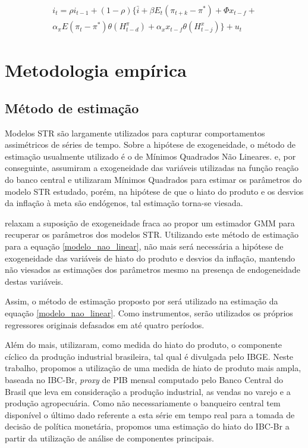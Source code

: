 \documentclass[
	article,			%
	11pt,				%
	oneside,			%
	a4paper,			%
	english,			%
	brazil,				%
	]{abntex2}
\begin{document}
	\begin{eqnarray}  \label{modelo_nao_linear}
		i_t = \rho i_{t-1} + (1-\rho) \{ \bar{i} + \beta E_t(\pi_{t+k} - \pi^*) + \Phi x_{t-f} + \nonumber \\ 
		 \alpha_\pi E(\pi_t - \pi^*)\theta(H_{t-d}^\pi) + \alpha_x x_{t-f} \theta (H_{t-j}^x) \} + u_t
	\end{eqnarray}
	


	
	\section{Metodologia empírica}	
	
	\subsection{Método de estimação}
	
	Modelos STR são largamente utilizados para capturar comportamentos assimétricos de séries de tempo. Sobre a hipótese de exogeneidade, o método de estimação usualmente utilizado é o de Mínimos Quadrados Não Lineares.  e, por conseguinte,  assumiram a exogeneidade das variáveis utilizadas na função reação do banco central e utilizaram Mínimos Quadrados para estimar os parâmetros do modelo STR estudado, porém, na hipótese de que o hiato do produto e os desvios da inflação à meta são endógenos, tal estimação torna-se viesada.
	
	 relaxam a suposição de exogeneidade fraca ao propor um estimador GMM para recuperar os parâmetros dos modelos STR.	Utilizando este método de estimação para a equação \ref{modelo_nao_linear}, não mais será necessária a hipótese de exogeneidade das variáveis de hiato do produto e desvios da inflação, mantendo não viesados as estimações dos parâmetros mesmo na presença de endogeneidade destas variáveis.
	
	Assim, o método de estimação proposto por  será utilizado na estimação da equação \ref{modelo_nao_linear}. Como instrumentos, serão utilizados os próprios regressores originais defasados em até quatro períodos.
	
	Além do mais,  utilizaram, como medida do hiato do produto, o componente cíclico da produção industrial brasileira, tal qual é divulgada pelo IBGE. Neste trabalho, propomos a utilização de uma medida de hiato de produto mais ampla, baseada no IBC-Br, \textsl{proxy} de PIB mensal computado pelo Banco Central do Brasil que leva em consideração a produção industrial, as vendas no varejo e a produção agropecuária. Como não necessariamente o banqueiro central tem disponível o último dado referente a esta série em tempo real para a tomada de decisão de política monetária, propomos uma estimação do hiato do IBC-Br a partir da utilização de análise de componentes principais.
	
\end{document}
